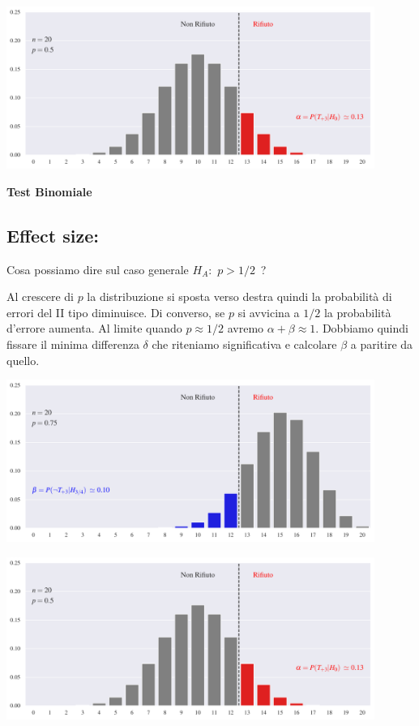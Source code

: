 \documentclass[11pt,openany]{book}
\begin{document}
\hfil\includegraphics[width=0.9\textwidth]{figure/B-test_01.pdf}




\hfill{}\clearpage\hfill\textbf{Test Binomiale}\subsection{Effect size: \boldmath{$\delta$}}


Cosa possiamo dire sul caso generale $H_A:$ $p>1/2$~?

Al crescere di $p$ la distribuzione si sposta verso destra quindi la probabilità di errori del II tipo diminuisce. Di converso, se $p$ si avvicina a $1/2$  la probabilità d'errore aumenta. Al limite quando $p\approx 1/2$ avremo $\alpha+\beta\approx 1$. Dobbiamo quindi fissare il minima differenza $\delta$ che riteniamo significativa e calcolare $\beta$ a paritire da quello.


\hfil\includegraphics[width=0.9\textwidth]{figure/B-test_02.pdf}

\hfil\includegraphics[width=0.9\textwidth]{figure/B-test_01.pdf}
\end{document}
